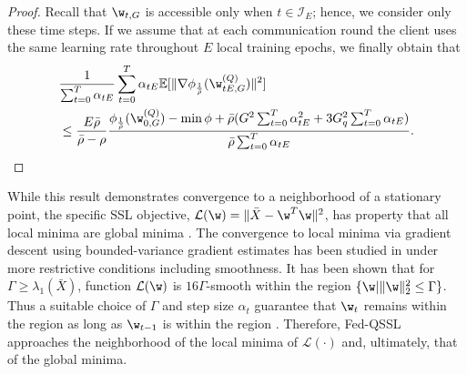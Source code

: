 \documentclass[a4paper,11pt]{article}
\begin{document}
\begin{proof}
Recall that $\w_{t, G}$ is accessible only when $t \in \mathcal{I}_E$; hence, we consider only these time steps.
If we assume that at each communication round the client uses the same learning rate throughout $E$ local training epochs, we finally obtain that 
\begin{align*}
    & \frac{1}{\sum_{t=0}^T \alpha_{tE}} \sum_{t=0}^T \alpha_{tE} \mathbb{E} [ \|\nabla \phi_{\frac{1}{\bar{\rho}}} (\w^{(Q)}_{tE, G}) \|^2 ] \\
    & \leq \frac{E \bar{\rho}}{\bar{\rho} - \rho} \frac{ \phi_{\frac{1}{\bar{\rho}}}(\w^{(Q)}_{0, G}) - \min \phi +  \bar{\rho}(G^2\sum_{t=0}^T \alpha^2_{tE}+3G_q^2\sum_{t=0}^T \alpha_{tE})}{\bar{\rho}\sum_{t=0}^T \alpha_{tE} }.
\end{align*}
\end{proof}

While this result demonstrates convergence to a neighborhood of a stationary point, the specific SSL objective, $\mathcal{L}(\w) = \|\bar{X} - \w^T \w \|^2$, has property that all local minima are global minima \cite{jin2017escape}. The convergence to local minima via gradient descent using  bounded-variance gradient estimates has been studied in \cite{mertikopoulos2020almost} under more restrictive conditions including smoothness. It has been shown that for $\Gamma \geq \lambda_1(\bar{X})$, function $\mathcal{L}(\w)$ is $16\Gamma$-smooth within the region $\{\w | \|\w \|_2^2 \leq \Gamma \}$. Thus a suitable choice of $\Gamma$ and step size $\alpha_t$ guarantee that $\w_t$ remains within the region as long as $\w_{t-1}$ is within the region \cite{jin2017escape}. Therefore, Fed-QSSL approaches the neighborhood of the local minima of $\mathcal{L}(\cdot)$ and, ultimately, that of the global minima. 
\end{document}
